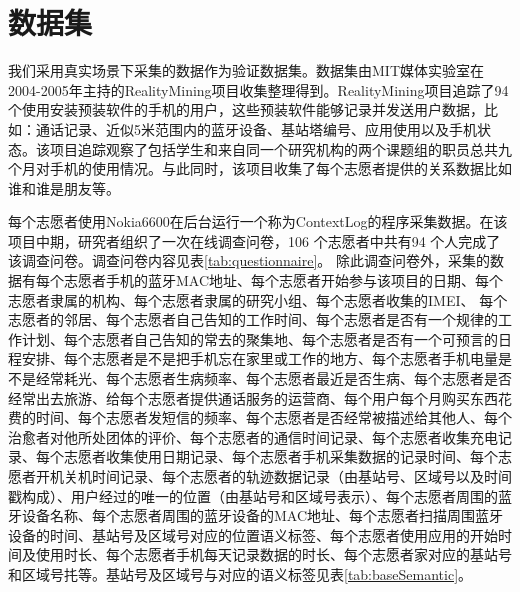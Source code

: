 \section{数据集}
\label{sec:section5-1}
我们采用真实场景下采集的数据作为验证数据集。数据集由MIT媒体实验室在2004-2005年主持的RealityMining项目收集整理得到。RealityMining项目追踪了94个使用安装预装软件的手机的用户，这些预装软件能够记录并发送用户数据，比如：通话记录、近似5米范围内的蓝牙设备、基站塔编号、应用使用以及手机状态。该项目追踪观察了包括学生和来自同一个研究机构的两个课题组的职员总共九个月对手机的使用情况。与此同时，该项目收集了每个志愿者提供的关系数据比如谁和谁是朋友等。
\par 每个志愿者使用Nokia6600在后台运行一个称为ContextLog的程序采集数据。在该项目中期，研究者组织了一次在线调查问卷，106 个志愿者中共有94 个人完成了该调查问卷。调查问卷内容见表\ref{tab:questionnaire}。 除此调查问卷外，采集的数据有每个志愿者手机的蓝牙MAC地址、每个志愿者开始参与该项目的日期、每个志愿者隶属的机构、每个志愿者隶属的研究小组、每个志愿者收集的IMEI、 每个志愿者的邻居、每个志愿者自己告知的工作时间、每个志愿者是否有一个规律的工作计划、每个志愿者自己告知的常去的聚集地、每个志愿者是否有一个可预言的日程安排、每个志愿者是不是把手机忘在家里或工作的地方、每个志愿者手机电量是不是经常耗光、每个志愿者生病频率、每个志愿者最近是否生病、每个志愿者是否经常出去旅游、给每个志愿者提供通话服务的运营商、每个用户每个月购买东西花费的时间、每个志愿者发短信的频率、每个志愿者是否经常被描述给其他人、每个治愈者对他所处团体的评价、每个志愿者的通信时间记录、每个志愿者收集充电记录、每个志愿者收集使用日期记录、每个志愿者手机采集数据的记录时间、每个志愿者开机关机时间记录、每个志愿者的轨迹数据记录（由基站号、区域号以及时间戳构成）、用户经过的唯一的位置（由基站号和区域号表示）、每个志愿者周围的蓝牙设备名称、每个志愿者周围的蓝牙设备的MAC地址、每个志愿者扫描周围蓝牙设备的时间、基站号及区域号对应的位置语义标签、每个志愿者使用应用的开始时间及使用时长、每个志愿者手机每天记录数据的时长、每个志愿者家对应的基站号和区域号扥等。基站号及区域号与对应的语义标签见表\ref{tab:baseSemantic}。
